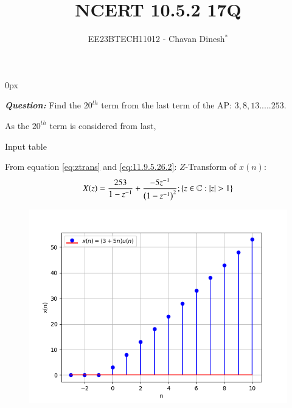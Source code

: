 \documentclass[journal,12pt,twocolumn]{IEEEtran}
\theoremstyle{remark}
\begin{document}
\parindent 0px

\vspace{3cm}

\title{NCERT 10.5.2 17Q}
\author{EE23BTECH11012 - Chavan Dinesh$^{*}$%
}
\maketitle
\newpage
\bigskip

\renewcommand{\thefigure}{\arabic{figure}}
\renewcommand{\thetable}{\arabic{table}}
\large\textbf{\textsl{Question:}}
Find the $20^{th}$ term from the last term of the AP: $3,8,13.....253$.

\solution

As the $20^{th}$ term is considered from last, 

\begin{table}[htbp]
    \centering
    
    \caption{Input table}
    \label{tab:parameter_table.10.5.2.17}
\end{table}

From equation \eqref{eq:ztrans} and \eqref{eq:11.9.5.26.2}:
\(Z\)-Transform of \(x(n)\):
\begin{align}
 X(z) =\frac{253}{1-z^{-1}}+ \frac{-5z^{-1}}{\brak{1-z^{-1}}^2};\cbrak{z\in\mathbb{C} : |z|>1}
\end{align}

\begin{figure}[ht]
    \centering
    \includegraphics[width = \columnwidth]{figs/x(n)_vs_n.png}
    \caption{}
    \label{fig:graph1}
\end{figure}


\end{document}
